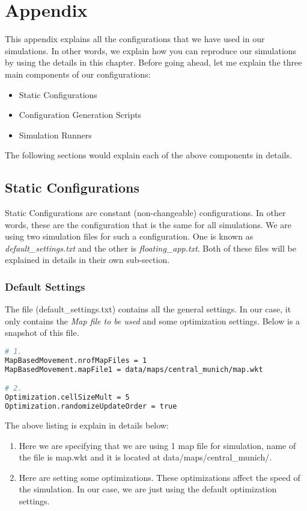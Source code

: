 
\chapter{Appendix}\label{chapter:appendix}
This appendix explains all the configurations that we have used in our simulations. In other words, we explain how you can reproduce our simulations by using the details in this chapter. Before going ahead, let me explain the three main components of our configurations:

\begin{itemize}
  \item Static Configurations
  \item Configuration Generation Scripts
  \item Simulation Runners
\end{itemize}

The following sections would explain each of the above components in details.

\section{Static Configurations}
Static Configurations are constant (non-changeable) configurations. In other words, these are the configuration that is the same for all simulations. We are using two simulation files for such a configuration. One is known as \textit{default\_settings.txt} and the other is \textit{floating\_app.txt}. Both of these files will be explained in details in their own sub-section.

\subsection{Default Settings}
The file (default\_settings.txt) contains all the general settings. In our case, it only contains the \textit{Map file to be used} and some optimization settings. Below is a snapshot of this file.

\begin{lstlisting}[language=bash]
# 1.
MapBasedMovement.nrofMapFiles = 1
MapBasedMovement.mapFile1 = data/maps/central_munich/map.wkt

# 2.
Optimization.cellSizeMult = 5
Optimization.randomizeUpdateOrder = true
\end{lstlisting}
\vspace{4mm}
The above listing is explain in details below:
\begin{enumerate}
  \item Here we are specifying that we are using 1 map file for simulation, name of the file is map.wkt and it is located at data/maps/central\_munich/.
  \item Here are setting some optimizations. These optimizations affect the speed of the simulation. In our case, we are just using the default optimization settings.
\end{enumerate}

